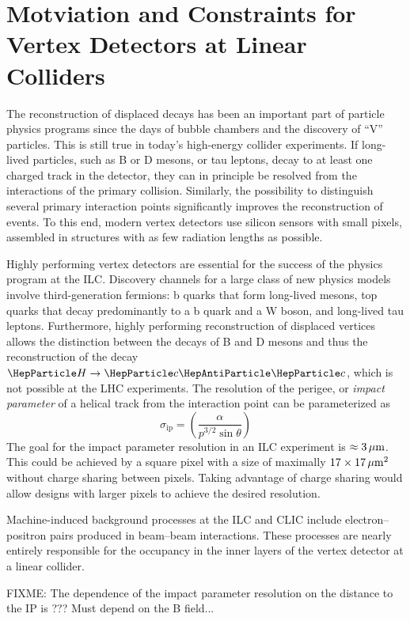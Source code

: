\section{Motviation and Constraints for Vertex Detectors at Linear Colliders}

The reconstruction of displaced decays has been an important part of particle physics programs since the days of bubble chambers and the discovery of ``V'' particles. This is still true in today's high-energy collider experiments. If long-lived particles, such as B or D mesons, or tau leptons, decay to at least one charged track in the detector, they can in principle be resolved from the interactions of the primary collision. Similarly, the possibility to distinguish several primary interaction points significantly improves the reconstruction of events. To this end, modern vertex detectors use silicon sensors with small pixels, assembled in structures with as few radiation lengths as possible.

Highly performing vertex detectors are essential for the success of the physics program at the ILC. Discovery channels for a large class of new physics models involve third-generation fermions: b quarks that form long-lived mesons, top quarks that decay predominantly to a b quark and a W boson, and long-lived tau leptons. Furthermore, highly performing reconstruction of displaced vertices allows the distinction between the decays of B and D mesons and thus the reconstruction of the decay $\PH\to\PQc\PAQc$, which is not possible at the LHC experiments. The resolution of the perigee, or \emph{impact parameter} of a helical track from the interaction point can be parameterized as
\begin{equation}
	\sigma_\text{ip} = \left(\frac{\alpha}{p^{3/2}\sin\theta}\right)
\end{equation}
The goal for the impact parameter resolution in an ILC experiment is $\approx\unit[3]{\micron}$. This could be achieved by a square pixel with a size of maximally $17\times \unit[17]{\micron^2}$ without charge sharing between pixels. Taking advantage of charge sharing would allow designs with larger pixels to achieve the desired resolution.

Machine-induced background processes at the ILC and CLIC include electron--positron pairs produced in beam--beam interactions. These processes are nearly entirely responsible for the occupancy in the inner layers of the vertex detector at a linear collider.

FIXME: The dependence of the impact parameter resolution on the distance to the IP is ??? Must depend on the B field...
